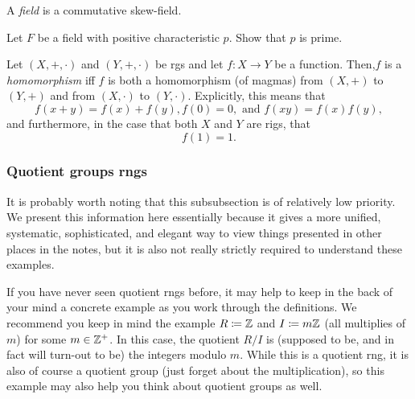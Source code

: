\begin{dfn}[Field]
A \emph{field} is a commutative skew-field.
\end{dfn}
\begin{exr}
Let $F$ be a field with positive characteristic $p$.  Show that $p$ is prime.
\end{exr}
\begin{dfn}
Let $(X,+,\cdot )$ and $(Y,+,\cdot )$ be rgs and let $f:X\rightarrow Y$ be a function.  Then,$f$ is a \emph{homomorphism} iff $f$ is both a homomorphism (of magmas) from $(X,+)$ to $(Y,+)$ and from $(X,\cdot )$ to $(Y,\cdot )$.  Explicitly, this means that
\begin{equation}
f(x+y)=f(x)+f(y),f(0)=0,\text{ and }f(xy)=f(x)f(y),
\end{equation}
and furthermore, in the case that both $X$ and $Y$ are rigs, that
\begin{equation}
f(1)=1.
\end{equation}
\end{dfn}

\subsubsection{Quotient groups rngs}

It is probably worth noting that this subsubsection is of relatively low priority.  We present this information here essentially because it gives a more unified, systematic, sophisticated, and elegant way to view things presented in other places in the notes, but it is also not really strictly required to understand these examples.

If you have never seen quotient rngs before, it may help to keep in the back of your mind a concrete example as you work through the definitions.  We recommend you keep in mind the example $R\coloneqq \mathbb{Z}$ and $I\coloneqq m\mathbb{Z}$ (all multiplies of $m$) for some $m\in \mathbb{Z} ^+$.  In this case, the quotient $R/I$ is (supposed to be, and in fact will turn-out to be) the integers modulo $m$.  While this is a quotient rng, it is also of course a quotient group (just forget about the multiplication), so this example may also help you think about quotient groups as well.

